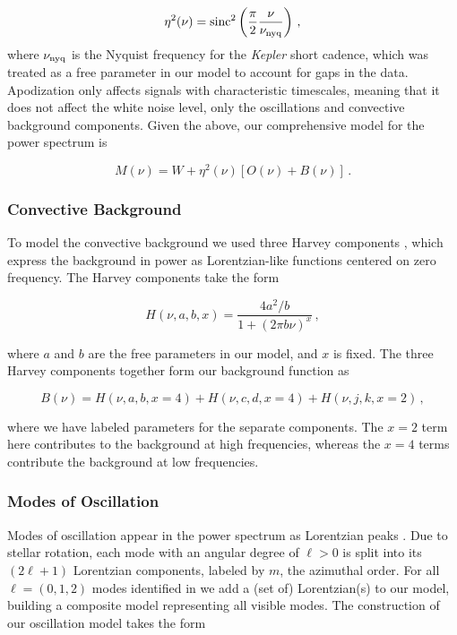 \documentclass[12pt]{article}
\newcommand{\kepler}{\emph{Kepler}\xspace}
\begin{document}
\begin{equation}\label{eq:apodization}
	\eta^2(\nu) = \rm{sinc}^2\left(\frac{\pi}{2}\frac{\nu}{\nu_{\rm nyq}}\right)\, ,
\end{equation}
where $\nu_{\rm nyq}$ is the Nyquist frequency for the \kepler short cadence, which was treated as a free parameter in our model to account for gaps in the data. Apodization only affects signals with characteristic timescales, meaning that it does not affect the white noise level, only the oscillations and convective background components. Given the above, our comprehensive model for the power spectrum is

\begin{equation}\label{eq:model}
	M(\nu) = W + \eta^2(\nu)[O(\nu) + B(\nu)]\, .
\end{equation}

\subsubsection{Convective Background}
To model the convective background we used three Harvey components \cite{harvey1985}, which express the background in power as Lorentzian-like functions centered on zero frequency. The Harvey components take the form 

\begin{equation}
	H(\nu, a, b, x) = \frac{4a^2/b}{1 + (2\pi b\nu)^x}\, ,
\end{equation}

\noindent where $a$ and $b$ are the free parameters in our model, and $x$ is fixed. The three Harvey components together form our background function as

\begin{equation}\label{eq:background}
	B(\nu) = H(\nu, a, b, x=4) + H(\nu, c, d, x=4) + H(\nu, j, k, x=2)\, ,
\end{equation}

\noindent where we have labeled parameters for the separate components. The $x = 2$ term here contributes to the background at high frequencies, whereas the $x=4$ terms contribute the background at low frequencies.

\subsubsection{Modes of Oscillation}
Modes of oscillation appear in the power spectrum as Lorentzian peaks \cite{chaplin+basu2017}. Due to stellar rotation, each mode with an angular degree of $\ell > 0$ is split into its $(2\ell +1)$ Lorentzian components, labeled by $m$, the azimuthal order. For all $\ell=(0,1,2)$ modes identified in \cite{davies+2016,lund+2017} we add a (set of) Lorentzian(s) to our model, building a composite model representing all visible modes. The construction of our oscillation model takes the form
\end{document}
